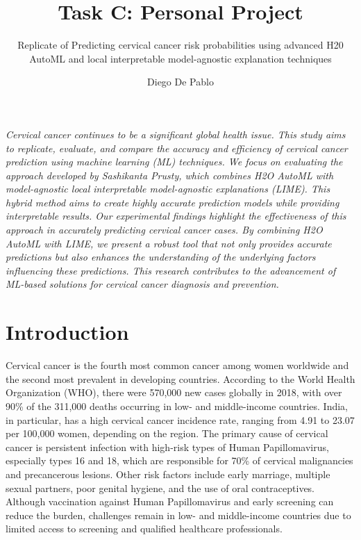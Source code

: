 \documentclass{llncs}
\begin{document}
\title{Task C: Personal Project}
\subtitle{Replicate of Predicting cervical cancer risk probabilities using advanced H20 AutoML and local interpretable model-agnostic explanation techniques}

\author{Diego De Pablo}

\maketitle 

\vspace{1cm} %

\textit{
	Cervical cancer continues to be a significant global health issue. This study aims to replicate, evaluate, and compare the accuracy and efficiency of cervical cancer prediction using machine learning (ML) techniques. We focus on evaluating the approach developed by Sashikanta Prusty\cite{prusty2024predicting}, which combines H2O AutoML with model-agnostic local interpretable model-agnostic explanations (LIME). This hybrid method aims to create highly accurate prediction models while providing interpretable results. Our experimental findings highlight the effectiveness of this approach in accurately predicting cervical cancer cases. By combining H2O AutoML with LIME, we present a robust tool that not only provides accurate predictions but also enhances the understanding of the underlying factors influencing these predictions. This research contributes to the advancement of ML-based solutions for cervical cancer diagnosis and prevention.
	 }



\section{Introduction}

Cervical cancer is the fourth most common cancer among women worldwide and the second most prevalent in developing countries. According to the World Health Organization (WHO), there were 570,000 new cases globally in 2018, with over 90\% of the 311,000 deaths occurring in low- and middle-income countries. India, in particular, has a high cervical cancer incidence rate, ranging from 4.91 to 23.07 per 100,000 women, depending on the region. The primary cause of cervical cancer is persistent infection with high-risk types of Human Papillomavirus, especially types 16 and 18, which are responsible for 70\% of cervical malignancies and precancerous lesions. Other risk factors include early marriage, multiple sexual partners, poor genital hygiene, and the use of oral contraceptives. Although vaccination against Human Papillomavirus and early screening can reduce the burden, challenges remain in low- and middle-income countries due to limited access to screening and qualified healthcare professionals. 
\end{document}
